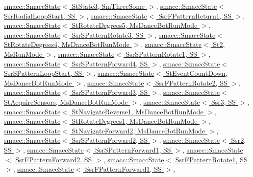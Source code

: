 \hyperlink{classsmacc_1_1SmaccState_afc39f8e0ca4001b2159a100da2fccd0e}{smacc\+::\+Smacc\+State$<$ St\+State3, Sm\+Three\+Some $>$}, \hyperlink{classsmacc_1_1SmaccState_afc39f8e0ca4001b2159a100da2fccd0e}{smacc\+::\+Smacc\+State$<$ Ssr\+Radial\+Loop\+Start, S\+S $>$}, \hyperlink{classsmacc_1_1SmaccState_afc39f8e0ca4001b2159a100da2fccd0e}{smacc\+::\+Smacc\+State$<$ Ssr\+F\+Pattern\+Return1, S\+S $>$}, \hyperlink{classsmacc_1_1SmaccState_afc39f8e0ca4001b2159a100da2fccd0e}{smacc\+::\+Smacc\+State$<$ St\+Rotate\+Degrees5, Ms\+Dance\+Bot\+Run\+Mode $>$}, \hyperlink{classsmacc_1_1SmaccState_afc39f8e0ca4001b2159a100da2fccd0e}{smacc\+::\+Smacc\+State$<$ Ssr\+S\+Pattern\+Rotate3, S\+S $>$}, \hyperlink{classsmacc_1_1SmaccState_afc39f8e0ca4001b2159a100da2fccd0e}{smacc\+::\+Smacc\+State$<$ St\+Rotate\+Degrees4, Ms\+Dance\+Bot\+Run\+Mode $>$}, \hyperlink{classsmacc_1_1SmaccState_afc39f8e0ca4001b2159a100da2fccd0e}{smacc\+::\+Smacc\+State$<$ St2, Ms\+Run\+Mode $>$}, \hyperlink{classsmacc_1_1SmaccState_afc39f8e0ca4001b2159a100da2fccd0e}{smacc\+::\+Smacc\+State$<$ Ssr\+S\+Pattern\+Rotate1, S\+S $>$}, \hyperlink{classsmacc_1_1SmaccState_afc39f8e0ca4001b2159a100da2fccd0e}{smacc\+::\+Smacc\+State$<$ Ssr\+S\+Pattern\+Forward4, S\+S $>$}, \hyperlink{classsmacc_1_1SmaccState_afc39f8e0ca4001b2159a100da2fccd0e}{smacc\+::\+Smacc\+State$<$ Ssr\+S\+Pattern\+Loop\+Start, S\+S $>$}, \hyperlink{classsmacc_1_1SmaccState_afc39f8e0ca4001b2159a100da2fccd0e}{smacc\+::\+Smacc\+State$<$ St\+Event\+Count\+Down, Ms\+Dance\+Bot\+Run\+Mode $>$}, \hyperlink{classsmacc_1_1SmaccState_afc39f8e0ca4001b2159a100da2fccd0e}{smacc\+::\+Smacc\+State$<$ Ssr\+F\+Pattern\+Rotate2, S\+S $>$}, \hyperlink{classsmacc_1_1SmaccState_afc39f8e0ca4001b2159a100da2fccd0e}{smacc\+::\+Smacc\+State$<$ Ssr\+S\+Pattern\+Forward3, S\+S $>$}, \hyperlink{classsmacc_1_1SmaccState_afc39f8e0ca4001b2159a100da2fccd0e}{smacc\+::\+Smacc\+State$<$ St\+Acquire\+Sensors, Ms\+Dance\+Bot\+Run\+Mode $>$}, \hyperlink{classsmacc_1_1SmaccState_afc39f8e0ca4001b2159a100da2fccd0e}{smacc\+::\+Smacc\+State$<$ Ssr3, S\+S $>$}, \hyperlink{classsmacc_1_1SmaccState_afc39f8e0ca4001b2159a100da2fccd0e}{smacc\+::\+Smacc\+State$<$ St\+Navigate\+Reverse1, Ms\+Dance\+Bot\+Run\+Mode $>$}, \hyperlink{classsmacc_1_1SmaccState_afc39f8e0ca4001b2159a100da2fccd0e}{smacc\+::\+Smacc\+State$<$ St\+Rotate\+Degrees1, Ms\+Dance\+Bot\+Run\+Mode $>$}, \hyperlink{classsmacc_1_1SmaccState_afc39f8e0ca4001b2159a100da2fccd0e}{smacc\+::\+Smacc\+State$<$ St\+Navigate\+Forward2, Ms\+Dance\+Bot\+Run\+Mode $>$}, \hyperlink{classsmacc_1_1SmaccState_afc39f8e0ca4001b2159a100da2fccd0e}{smacc\+::\+Smacc\+State$<$ Ssr\+S\+Pattern\+Forward2, S\+S $>$}, \hyperlink{classsmacc_1_1SmaccState_afc39f8e0ca4001b2159a100da2fccd0e}{smacc\+::\+Smacc\+State$<$ Ssr2, S\+S $>$}, \hyperlink{classsmacc_1_1SmaccState_afc39f8e0ca4001b2159a100da2fccd0e}{smacc\+::\+Smacc\+State$<$ Ssr\+S\+Pattern\+Forward1, S\+S $>$}, \hyperlink{classsmacc_1_1SmaccState_afc39f8e0ca4001b2159a100da2fccd0e}{smacc\+::\+Smacc\+State$<$ Ssr\+F\+Pattern\+Forward2, S\+S $>$}, \hyperlink{classsmacc_1_1SmaccState_afc39f8e0ca4001b2159a100da2fccd0e}{smacc\+::\+Smacc\+State$<$ Ssr\+F\+Pattern\+Rotate1, S\+S $>$}, \hyperlink{classsmacc_1_1SmaccState_afc39f8e0ca4001b2159a100da2fccd0e}{smacc\+::\+Smacc\+State$<$ Ssr\+F\+Pattern\+Forward1, S\+S $>$}, 